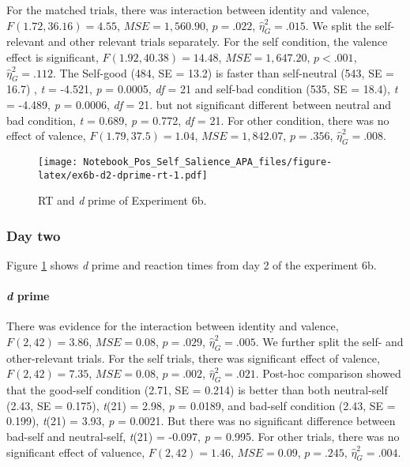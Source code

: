 \documentclass[man]{apa6}
\let\oldparagraph\paragraph
\renewcommand{\paragraph}[1]{\oldparagraph{#1}\mbox{}}
\begin{document}
For the matched trials, there was interaction between identity and valence, \(F(1.72, 36.16) = 4.55\), \(\mathit{MSE} = 1,560.90\), \(p = .022\), \(\hat{\eta}^2_G = .015\). We split the self-relevant and other relevant trials separately. For the self condition, the valence effect is significant, \(F(1.92, 40.38) = 14.48\), \(\mathit{MSE} = 1,647.20\), \(p < .001\), \(\hat{\eta}^2_G = .112\). The Self-good (484, SE = 13.2) is faster than self-neutral (543, SE = 16.7) , \emph{t} = -4.521, \emph{p} = 0.0005, \emph{df} = 21 and self-bad condition (535, SE = 18.4), \emph{t} = -4.489, \emph{p} = 0.0006, \emph{df} = 21. but not significant different between neutral and bad condition, \emph{t} = 0.689, \emph{p} = 0.772, \emph{df} = 21. For other condition, there was no effect of valence, \(F(1.79, 37.5) = 1.04\), \(\mathit{MSE} = 1,842.07\), \(p = .356\), \(\hat{\eta}^2_G = .008\).

\begin{figure}
\centering
\texttt{[image: Notebook\_Pos\_Self\_Salience\_APA\_files/figure-latex/ex6b-d2-dprime-rt-1.pdf]}
\caption{\label{fig:ex6b-d2-dprime-rt}RT and \emph{d} prime of Experiment 6b.}
\end{figure}

\hypertarget{day-two}{%
\subsubsection{Day two}\label{day-two}}

Figure \ref{fig:ex6b-d2-dprime-rt} shows \emph{d} prime and reaction times from day 2 of the experiment 6b.

\hypertarget{d-prime-8}{%
\paragraph{\texorpdfstring{\emph{d} prime}{d prime}}\label{d-prime-8}}

There was evidence for the interaction between identity and valence, \(F(2, 42) = 3.86\), \(\mathit{MSE} = 0.08\), \(p = .029\), \(\hat{\eta}^2_G = .005\). We further split the self- and other-relevant trials. For the self trials, there was significant effect of valence, \(F(2, 42) = 7.35\), \(\mathit{MSE} = 0.08\), \(p = .002\), \(\hat{\eta}^2_G = .021\). Post-hoc comparison showed that the good-self condition (2.71, SE = 0.214) is better than both neutral-self (2.43, SE = 0.175), \emph{t}(21) = 2.98, \emph{p} = 0.0189, and bad-self condition (2.43, SE = 0.199), \emph{t}(21) = 3.93, \emph{p} = 0.0021. But there was no significant difference between bad-self and neutral-self, \emph{t}(21) = -0.097, \emph{p} = 0.995. For other trials, there was no significant effect of valuence, \(F(2, 42) = 1.46\), \(\mathit{MSE} = 0.09\), \(p = .245\), \(\hat{\eta}^2_G = .004\).
\end{document}
